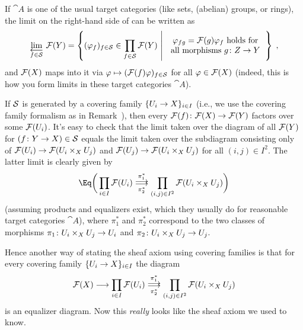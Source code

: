 \documentclass[a4paper,parskip=half,numbers=enddot, DIV=12]{scrreprt}
\begin{document}
\begin{rem}
	\begin{alphanumerate}
		\item {}If $\cat A$ is one of the usual target categories (like sets, (abelian) groups, or rings), the limit on the right-hand side of  can be written as
		\begin{align*}
			\limit[f\in\Ss]\Ff(Y)=\left\{(\phi_f)_{f\in\Ss}\in\prod_{f\in\Ss}\Ff(Y)\st
			\begin{tabular}{c}
				$\phi_{fg}=\Ff(g)\phi_f$ holds for\\
				all morphisms $g\colon Z\to Y$
			\end{tabular} \right\}\;,
		\end{align*}
		and $\mathcal{F}(X)$ maps into it via $\varphi\mapsto (\mathcal{F}(f)\varphi)_{f\in\mathcal{S}}$ for all $\varphi\in\mathcal{F}(X)$ (indeed, this is how you form limits in these target categories $\cat A$).
		\item If $\mathcal{S}$ is generated by a covering family $\{U_i\morphism X\}_{i\in I}$ (i.e., we use the covering family formalism as in Remark~), then every $\Ff(f)\colon \Ff(X)\morphism \Ff(Y)$ factors over some $\mathcal{F}(U_i)$. It's easy to check that the limit taken over the diagram of all $\mathcal{F}(Y)$ for $(f\colon Y\morphism X)\in\Ss$ equals the limit taken over the subdiagram consisting only of $\Ff(U_i)\morphism\Ff(U_i\times_XU_j)$ and $\Ff(U_j)\morphism\Ff(U_i\times_XU_j)$ for all $(i,j)\in I^2$. The latter limit is clearly given by
		\begin{align*}
			\Eq\bigg(\prod_{i\in I}\Ff(U_i)\doublemorphism[\pi_1^*][\pi_2^*]\prod_{(i,j)\in I^2}\Ff(U_i\times_XU_j)\bigg)
		\end{align*}
		(assuming products and equalizers exist, which they usually do for reasonable target categories $\cat A$), where $\pi_1^*$ and $\pi_2^*$ correspond to the two classes of morphisms $\pi_1\colon U_i\times_XU_j\morphism U_ i$ and $\pi_2\colon U_i\times_XU_j\morphism U_j$.
		
		Hence another way of stating the sheaf axiom using covering families is that for every covering family $\{U_i\morphism X\}_{i\in I}$ the diagram
		\begin{align*}
			\Ff(X)\morphism\prod_{i\in I}\Ff(U_i)\doublemorphism[\pi_1^*][\pi_2^*]\prod_{(i,j)\in I^2}\Ff(U_i\times_XU_j)
		\end{align*}
		is an equalizer diagram. Now this \emph{really} looks like the sheaf axiom we used to know.
	\end{alphanumerate}
\end{rem}
\end{document}
